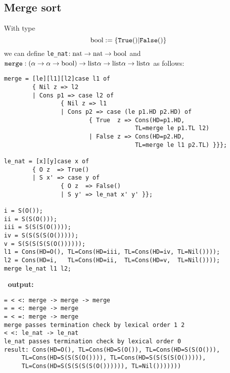 \subsection{Merge sort}
With type
$$
    \mathrm{bool} := \{ \mathtt{True()} | \mathtt{False()} \}
$$
we can define {\tt le\_nat}$: \mathrm{nat} \rightarrow \mathrm{nat} \rightarrow
\mathrm{bool}$ and
$\mathtt{merge} : (\alpha \rightarrow \alpha \rightarrow
\mathrm{bool}) \rightarrow \mathrm{list} \alpha \rightarrow \mathrm{list} \alpha \rightarrow
\mathrm{list} \alpha$ as follows:
\begin{verbatim}
merge = [le][l1][l2]case l1 of
        { Nil z => l2
        | Cons p1 => case l2 of
                { Nil z => l1
                | Cons p2 => case (le p1.HD p2.HD) of
                        { True  z => Cons(HD=p1.HD,
                                     TL=merge le p1.TL l2)
                        | False z => Cons(HD=p2.HD,
                                     TL=merge le l1 p2.TL) }}};

le_nat = [x][y]case x of
        { O z  => True()
        | S x' => case y of
                { O z  => False()
                | S y' => le_nat x' y' }};

i = S(O());
ii = S(S(O()));
iii = S(S(S(O())));
iv = S(S(S(S(O()))));
v = S(S(S(S(S(O())))));
l1 = Cons(HD=O(), TL=Cons(HD=iii, TL=Cons(HD=iv, TL=Nil())));
l2 = Cons(HD=i,   TL=Cons(HD=ii,  TL=Cons(HD=v,  TL=Nil())));
merge le_nat l1 l2;
\end{verbatim}
{\bf \foetus\ output:}\nopagebreak
\begin{verbatim}
= < <: merge -> merge -> merge
= = <: merge -> merge
= < =: merge -> merge
merge passes termination check by lexical order 1 2
< <: le_nat -> le_nat
le_nat passes termination check by lexical order 0
result: Cons(HD=O(), TL=Cons(HD=S(O()), TL=Cons(HD=S(S(O())),
     TL=Cons(HD=S(S(S(O()))), TL=Cons(HD=S(S(S(S(O())))),
     TL=Cons(HD=S(S(S(S(S(O()))))), TL=Nil()))))))
\end{verbatim}
